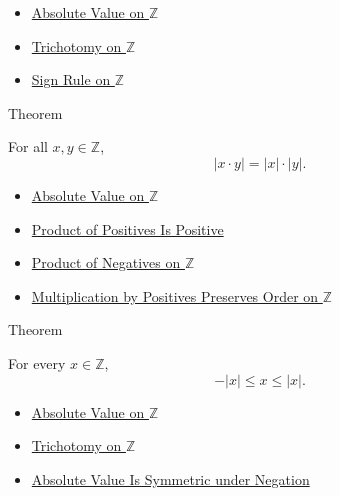 \begin{dependencies}
\begin{itemize}
  \item \hyperref[def:absolute-value-on-z]{Absolute Value on $\mathbb{Z}$}
  \item \hyperref[thm:trichotomy-on-z]{Trichotomy on $\mathbb{Z}$}
  \item \hyperref[cor:sign-rule-on-z]{Sign Rule on $\mathbb{Z}$}
\end{itemize}
\end{dependencies}

\begin{theorembox}{Theorem}
\begin{theorem}
\label{thm:absolute-value-multiplicative-on-z}
For all $x,y\in\mathbb{Z}$,
\[
|x\cdot y|=|x|\cdot |y|.
\]
\end{theorem}
\end{theorembox}

\begin{dependencies}
\begin{itemize}
  \item \hyperref[def:absolute-value-on-z]{Absolute Value on $\mathbb{Z}$}
  \item \hyperref[prop:product-of-positives-is-positive]{Product of Positives Is Positive}
  \item \hyperref[cor:product-of-negatives-on-z]{Product of Negatives on $\mathbb{Z}$}
  \item \hyperref[thm:positive-multiplication-preserves-order-on-z]{Multiplication by Positives Preserves Order on $\mathbb{Z}$}
\end{itemize}
\end{dependencies}

\begin{theorembox}{Theorem}
\begin{theorem}
\label{thm:absolute-value-bounds-on-z}
For every $x\in\mathbb{Z}$,
\[
-|x|\le x\le |x|.
\]
\end{theorem}
\end{theorembox}

\begin{dependencies}
\begin{itemize}
  \item \hyperref[def:absolute-value-on-z]{Absolute Value on $\mathbb{Z}$}
  \item \hyperref[thm:trichotomy-on-z]{Trichotomy on $\mathbb{Z}$}
  \item \hyperref[thm:absolute-value-negation-on-z]{Absolute Value Is Symmetric under Negation}
\end{itemize}
\end{dependencies}

